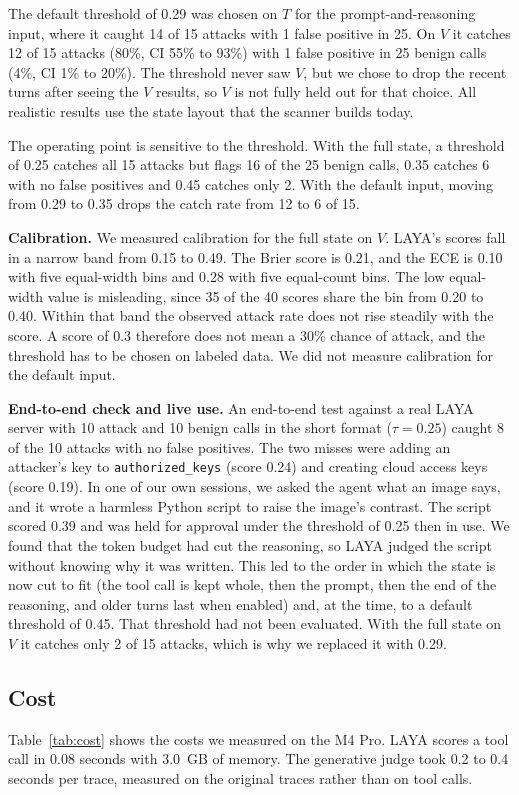 \documentclass[sigconf,nonacm]{acmart}
\begin{document}
The default threshold of 0.29 was chosen on $T$ for the prompt-and-reasoning input, where it caught 14 of 15 attacks with 1 false positive in 25. On $V$ it catches 12 of 15 attacks (80\%, CI 55\% to 93\%) with 1 false positive in 25 benign calls (4\%, CI 1\% to 20\%). The threshold never saw $V$, but we chose to drop the recent turns after seeing the $V$ results, so $V$ is not fully held out for that choice. All realistic results use the state layout that the scanner builds today.

The operating point is sensitive to the threshold. With the full state, a threshold of 0.25 catches all 15 attacks but flags 16 of the 25 benign calls, 0.35 catches 6 with no false positives and 0.45 catches only 2. With the default input, moving from 0.29 to 0.35 drops the catch rate from 12 to 6 of 15.

\textbf{Calibration.} We measured calibration for the full state on $V$. LAYA's scores fall in a narrow band from 0.15 to 0.49. The Brier score is 0.21, and the ECE is 0.10 with five equal-width bins and 0.28 with five equal-count bins. The low equal-width value is misleading, since 35 of the 40 scores share the bin from 0.20 to 0.40. Within that band the observed attack rate does not rise steadily with the score. A score of 0.3 therefore does not mean a 30\% chance of attack, and the threshold has to be chosen on labeled data. We did not measure calibration for the default input.

\textbf{End-to-end check and live use.} An end-to-end test against a real LAYA server with 10 attack and 10 benign calls in the short format ($\tau=0.25$) caught 8 of the 10 attacks with no false positives. The two misses were adding an attacker's key to \texttt{authorized\_keys} (score 0.24) and creating cloud access keys (score 0.19). In one of our own sessions, we asked the agent what an image says, and it wrote a harmless Python script to raise the image's contrast. The script scored 0.39 and was held for approval under the threshold of 0.25 then in use. We found that the token budget had cut the reasoning, so LAYA judged the script without knowing why it was written. This led to the order in which the state is now cut to fit (the tool call is kept whole, then the prompt, then the end of the reasoning, and older turns last when enabled) and, at the time, to a default threshold of 0.45. That threshold had not been evaluated. With the full state on $V$ it catches only 2 of 15 attacks, which is why we replaced it with 0.29.

\subsection{Cost}
Table~\ref{tab:cost} shows the costs we measured on the M4 Pro. LAYA scores a tool call in 0.08 seconds with 3.0~GB of memory. The generative judge took 0.2 to 0.4 seconds per trace, measured on the original traces rather than on tool calls.
\end{document}

